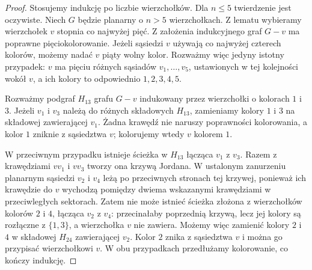 \documentclass[11pt,a4paper]{report}
\numberwithin{equation}{section}
\theoremstyle{plain}
\theoremstyle{definition}
\theoremstyle{remark}
\begin{document}
\begin{proof}
Stosujemy indukcję po liczbie wierzchołków. Dla
$n\le5$ twierdzenie jest oczywiste. Niech $G$
będzie planarny o $n>5$ wierzchołkach. Z lematu wybieramy
wierzchołek $v$ stopnia co najwyżej pięć. Z założenia
indukcyjnego graf $G-v$ ma poprawne pięciokolorowanie.
Jeżeli sąsiedzi $v$ używają co najwyżej czterech kolorów,
możemy nadać $v$ piąty wolny kolor. Rozważmy więc
jedyny istotny przypadek: $v$ ma pięciu różnych sąsiadów
$v_1,\ldots,v_5$, ustawionych w tej kolejności wokół $v$,
a ich kolory to odpowiednio $1,2,3,4,5$.

Rozważmy podgraf $H_{13}$ grafu $G-v$ indukowany przez
wierzchołki o kolorach $1$ i $3$. Jeżeli $v_1$ i $v_3$
należą do różnych składowych $H_{13}$, zamieniamy
kolory $1$ i $3$ na składowej zawierającej $v_1$.
Żadna krawędź nie naruszy poprawności kolorowania,
a kolor $1$ zniknie z sąsiedztwa $v$; kolorujemy wtedy
$v$ kolorem $1$.

W przeciwnym przypadku istnieje ścieżka w $H_{13}$
łącząca $v_1$ z $v_3$. Razem z krawędziami
$vv_1$ i $vv_3$ tworzy ona krzywą Jordana.
W ustalonym zanurzeniu planarnym sąsiedzi $v_2$ i $v_4$
leżą po przeciwnych stronach tej krzywej, ponieważ
ich krawędzie do $v$ wychodzą pomiędzy dwiema wskazanymi
krawędziami w przeciwległych sektorach.
Zatem nie może istnieć ścieżka złożona z wierzchołków
kolorów $2$ i $4$, łącząca $v_2$ z $v_4$:
przecinałaby poprzednią krzywą, lecz jej kolory są
rozłączne z $\{1,3\}$, a wierzchołka $v$ nie zawiera.
Możemy więc zamienić kolory $2$ i $4$ w składowej
$H_{24}$ zawierającej $v_2$. Kolor $2$ znika
z sąsiedztwa $v$ i można go przypisać wierzchołkowi $v$.
W obu przypadkach przedłużamy kolorowanie, co kończy indukcję.
\end{proof}

\begin{center}
\end{center}
\end{document}
